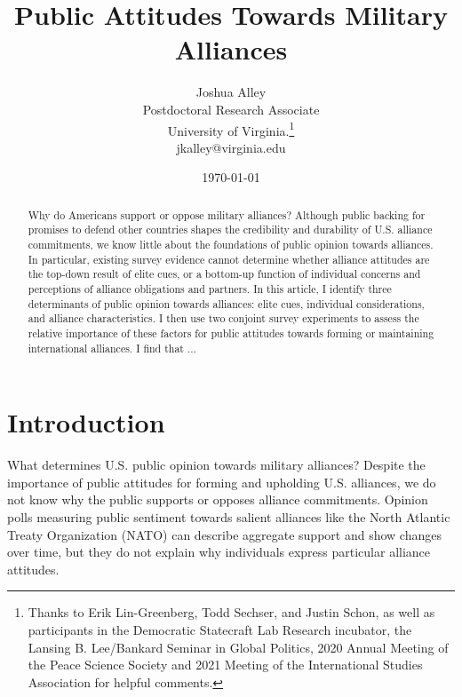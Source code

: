 \documentclass[12pt]{article}
\title{\textbf{Public Attitudes Towards Military Alliances}}
\author{Joshua Alley \\
Postdoctoral Research Associate \\
University of Virginia.\thanks{Thanks to Erik Lin-Greenberg, Todd Sechser, and Justin Schon, as well as participants in the Democratic Statecraft Lab Research incubator, the Lansing B. Lee/Bankard Seminar in Global Politics, 2020 Annual Meeting of the Peace Science Society and 2021 Meeting of the International Studies Association for helpful comments.} \\
jkalley@virginia.edu
}
\date{\today}
\begin{document}
\maketitle 

\doublespace 

\begin{abstract}
Why do Americans support or oppose military alliances? 
Although public backing for promises to defend other countries shapes the credibility and durability of U.S. alliance commitments, we know little about the foundations of public opinion towards alliances.
In particular, existing survey evidence cannot determine whether alliance attitudes are the top-down result of elite cues, or a bottom-up function of individual concerns and perceptions of alliance obligations and partners. 
In this article, I identify three determinants of public opinion towards alliances: elite cues, individual considerations, and alliance characteristics. 
I then use two conjoint survey experiments to assess the relative importance of these factors for public attitudes towards forming or maintaining international alliances.  
I find that ... 
\end{abstract}


\newpage 


\section{Introduction}

What determines U.S. public opinion towards military alliances? 
Despite the importance of public attitudes for forming and upholding U.S. alliances, we do not know why the public supports or opposes alliance commitments. 
Opinion polls measuring public sentiment towards salient alliances like the North Atlantic Treaty Organization (NATO) can describe aggregate support and show changes over time, but they do not explain why individuals express particular alliance attitudes. 
\end{document}
